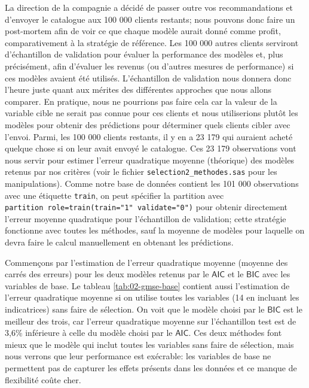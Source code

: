 \documentclass[
  11pt,
  letterpaper,
]{book}
\theoremstyle{definition}
\theoremstyle{definition}
\theoremstyle{definition}
\theoremstyle{definition}
\theoremstyle{remark}
\begin{document}
La direction de la compagnie a décidé de passer outre vos recommandations et d'envoyer le catalogue aux 100 000 clients restants; nous pouvons donc faire un post-mortem afin de voir ce que chaque modèle aurait donné comme profit, comparativement à la stratégie de référence.
Les 100 000 autres clients serviront d'échantillon de validation pour évaluer la performance des modèles et, plus précisément, afin d'évaluer les revenus (ou d'autres mesures de performance) si ces modèles avaient été utilisés. L'échantillon de validation nous donnera donc l'heure juste quant aux mérites des différentes approches que nous allons comparer. En pratique, nous ne pourrions pas faire cela car la valeur de la variable cible ne serait pas connue pour ces clients et nous utiliserions plutôt les modèles pour obtenir des prédictions pour déterminer quels clients cibler avec l'envoi. Parmi, les 100 000 clients restants, il y en a 23 179 qui auraient acheté quelque chose si on leur avait envoyé le catalogue. Ces 23 179 observations vont nous servir pour estimer l'erreur quadratique moyenne (théorique) des modèles retenus par nos critères (voir le fichier \texttt{selection2\_methodes.sas} pour les manipulations). Comme notre base de données contient les 101 000 observations avec une étiquette \texttt{train}, on peut spécifier la partition avec \texttt{partition\ role=train(train="1"\ validate="0")} pour obtenir directement l'erreur moyenne quadratique pour l'échantillon de validation; cette stratégie fonctionne avec toutes les méthodes, sauf la moyenne de modèles pour laquelle on devra faire le calcul manuellement en obtenant les prédictions.

Commençons par l'estimation de l'erreur quadratique moyenne (moyenne des carrés des erreurs) pour les deux modèles retenus par le \(\mathsf{AIC}\) et le \(\mathsf{BIC}\) avec les variables de base. Le tableau \ref{tab:02-gmse-base} contient aussi l'estimation de l'erreur quadratique moyenne si on utilise toutes les variables (14 en incluant les indicatrices) sans faire de sélection. On voit que le modèle choisi par le \(\mathsf{BIC}\) est le meilleur des trois, car l'erreur quadratique moyenne sur l'échantillon test est de 3,6\% inférieure à celle du modèle choisi par le \(\mathsf{AIC}\). Ces deux méthodes font mieux que le modèle qui inclut toutes les variables sans faire de sélection, mais nous verrons que leur performance est exécrable: les variables de base ne permettent pas de capturer les effets présents dans les données et ce manque de flexibilité coûte cher.
\end{document}
